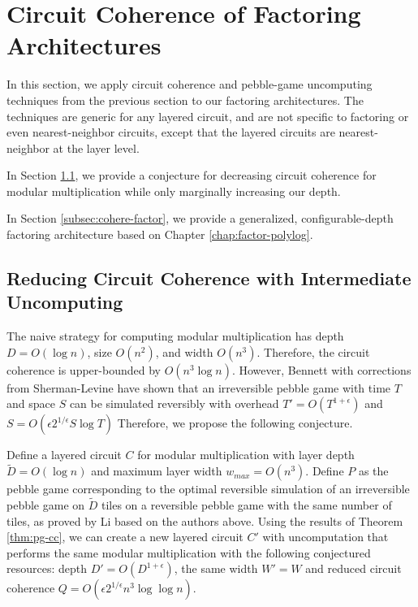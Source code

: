 \section{Circuit Coherence of Factoring Architectures}
\label{sec:cohere-factor}

In this section, we apply circuit coherence and pebble-game
uncomputing techniques from the previous section to our
factoring architectures. The techniques are generic for
any layered circuit, and are not specific to factoring or
even nearest-neighbor circuits, except that the layered circuits
are nearest-neighbor at the layer level.

In Section \ref{subsec:cohere-conject}, we provide a conjecture
for decreasing circuit coherence for modular multiplication while
only marginally increasing our depth.

In Section \ref{subsec:cohere-factor}, we provide a generalized,
configurable-depth factoring architecture based on
Chapter \ref{chap:factor-polylog}.

\subsection{Reducing Circuit Coherence with Intermediate Uncomputing}
\label{subsec:cohere-conject}

The naive strategy for computing modular multiplication has
depth $D = O(\log n)$, size $O(n^2)$, and width $O(n^3)$. Therefore, the
circuit coherence is upper-bounded by $O(n^3 \log n)$. However,
Bennett \cite{Bennett1989} with corrections from
Sherman-Levine \cite{Levine1990} have shown that an irreversible
pebble game with time $T$ and space $S$ can be simulated reversibly
with overhead $T' = O(T^{1+\epsilon})$ and $S = O(\epsilon 2^{1/\epsilon} S \log T)$
Therefore, we propose the following conjecture.

\begin{conjecture}
Define a layered circuit $C$ for modular multiplication
with layer depth $\tilde{D} = O(\log n)$ and maximum layer width
$w_{max} = O(n^3)$.
Define $P$ as the pebble game corresponding to the optimal reversible simulation of
an irreversible pebble game on $\tilde{D}$ tiles on a reversible
pebble game with the same number of tiles, as proved by
Li \cite{Li1998} based on the authors above.
Using the results of Theorem \ref{thm:pg-cc}, we can create a new
layered circuit $C'$ with uncomputation that performs the
same modular multiplication with the following conjectured resources:
depth $D' = O(D^{1+\epsilon})$,
the same width $W' = W$
and reduced circuit coherence $Q = O(\epsilon 2^{1/\epsilon} n^3 \log\log n)$.
\end{conjecture}

